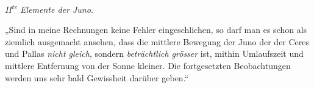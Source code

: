 \begin{center}
\emph{II\textsuperscript{te} Elemente der Juno.}
\end{center}

\begin{center}
\begingroup\fontsize{9}{11}\selectfont\setlength{\tabcolsep}{3pt}\renewcommand{\arraystretch}{1.1}
%
\ifdim\wd0>\linewidth\resizebox{\linewidth}{!}{\usebox{0}}\else\usebox{0}\fi\endgroup
\end{center}


„Sind in meine Rechnungen keine Fehler eingeschlichen, so darf man es schon als ziemlich ausgemacht ansehen, dass die mittlere Bewegung der Juno der der Ceres
 und Pallas \emph{nicht gleich}, sondern \emph{beträchtlich grösser} ist, mithin Umlaufszeit und mittlere Entfernung von der Sonne kleiner. Die fortgesetzten Beobachtungen werden uns sehr bald Gewissheit darüber geben.“

